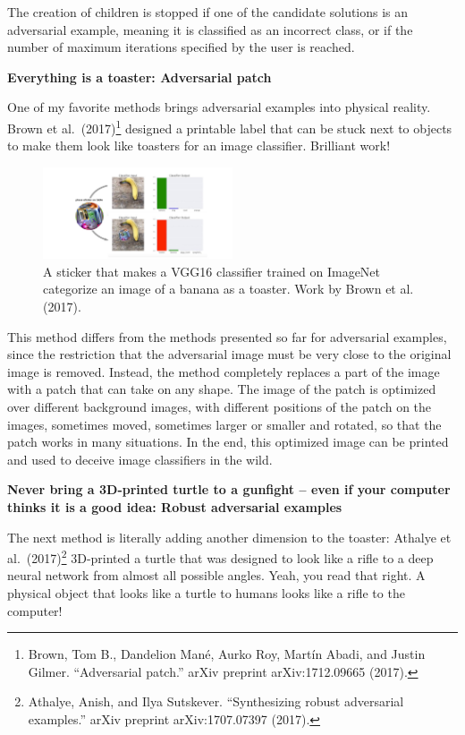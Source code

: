 \documentclass[
  10pt,
]{scrbook}
\begin{document}
The creation of children is stopped if one of the candidate solutions is an adversarial example, meaning it is classified as an incorrect class, or if the number of maximum iterations specified by the user is reached.

\textbf{Everything is a toaster: Adversarial patch}

One of my favorite methods brings adversarial examples into physical reality.
Brown et al.~(2017)\footnote{Brown, Tom B., Dandelion Mané, Aurko Roy, Martín Abadi, and Justin Gilmer. ``Adversarial patch.'' arXiv preprint arXiv:1712.09665 (2017).} designed a printable label that can be stuck next to objects to make them look like toasters for an image classifier.
Brilliant work!

\begin{figure}

{\centering \includegraphics[width=0.5\textwidth]{images/adversarial-toaster} 

}

\caption{A sticker that makes a VGG16 classifier trained on ImageNet categorize an image of a banana as a toaster. Work by Brown et al. (2017).}\label{fig:adversarial-toaster}
\end{figure}

This method differs from the methods presented so far for adversarial examples, since the restriction that the adversarial image must be very close to the original image is removed.
Instead, the method completely replaces a part of the image with a patch that can take on any shape.
The image of the patch is optimized over different background images, with different positions of the patch on the images, sometimes moved, sometimes larger or smaller and rotated, so that the patch works in many situations.
In the end, this optimized image can be printed and used to deceive image classifiers in the wild.

\textbf{Never bring a 3D-printed turtle to a gunfight -- even if your computer thinks it is a good idea: Robust adversarial examples}

The next method is literally adding another dimension to the toaster:
Athalye et al.~(2017)\footnote{Athalye, Anish, and Ilya Sutskever. ``Synthesizing robust adversarial examples.'' arXiv preprint arXiv:1707.07397 (2017).} 3D-printed a turtle that was designed to look like a rifle to a deep neural network from almost all possible angles.
Yeah, you read that right.
A physical object that looks like a turtle to humans looks like a rifle to the computer!
\end{document}
